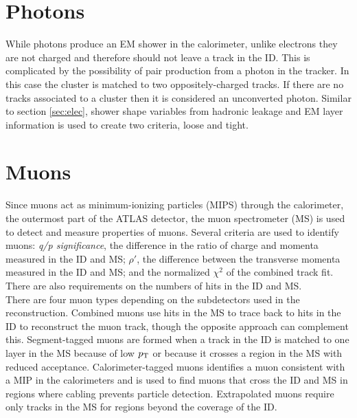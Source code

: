 

\section{Photons}

While photons produce an EM shower in the calorimeter, unlike electrons they are not charged and therefore should not leave a track in the ID.  This is complicated by the possibility of pair production from a photon in the tracker.  In this case the cluster is matched to two oppositely-charged tracks.  If there are no tracks associated to a cluster then it is considered an unconverted photon.  Similar to section \ref{sec:elec}, shower shape variables from hadronic leakage and EM layer information is used\cite{ATL-PHYS-PUB-2016-014} to create two criteria, loose and tight.  

\section{Muons}
\label{section:muons}

Since muons act as minimum-ionizing particles (MIPS) through the calorimeter, the outermost part of the ATLAS detector, the muon spectrometer (MS) is used to detect and measure properties of muons.  Several criteria are used to identify muons\cite{PERF-2015-10}: \textit{q/p significance}, the difference in the ratio of charge and momenta measured in the ID and MS; $\rho'$, the difference between the transverse momenta measured in the ID and MS; and the normalized $\chi^2$ of the combined track fit.  There are also requirements on the numbers of hits in the ID and MS. \\

There are four muon types depending on the subdetectors used in the reconstruction.  Combined muons use hits in the MS to trace back to hits in the ID to reconstruct the muon track, though the opposite approach can complement this.  Segment-tagged muons are formed when a track in the ID is matched to one layer in the MS because of low $p_{\mathrm{T}}$ or because it crosses a region in the MS with reduced acceptance.  Calorimeter-tagged muons identifies a muon consistent with a MIP in the calorimeters and is used to find muons that cross the ID and MS in regions where cabling prevents particle detection.  Extrapolated muons require only tracks in the MS for regions beyond the coverage of the ID.  \\

